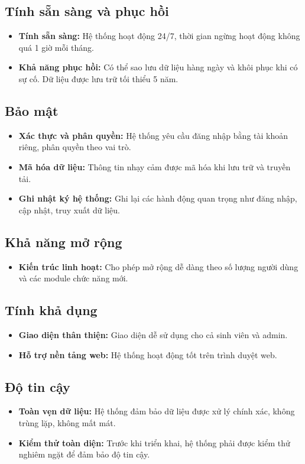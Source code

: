 \documentclass[12pt,a4paper]{report}
\begin{document}
\subsection{Tính sẵn sàng và phục hồi}
\begin{itemize}
    \item \textbf{Tính sẵn sàng:} Hệ thống hoạt động 24/7, thời gian ngừng hoạt động không quá 1 giờ mỗi tháng.
    \item \textbf{Khả năng phục hồi:} Có thể sao lưu dữ liệu hàng ngày và khôi phục khi có sự cố. Dữ liệu được lưu trữ tối thiểu 5 năm.
\end{itemize}

\subsection{Bảo mật}
\begin{itemize}
    \item \textbf{Xác thực và phân quyền:} Hệ thống yêu cầu đăng nhập bằng tài khoản riêng, phân quyền theo vai trò.
    \item \textbf{Mã hóa dữ liệu:} Thông tin nhạy cảm được mã hóa khi lưu trữ và truyền tải.
    \item \textbf{Ghi nhật ký hệ thống:} Ghi lại các hành động quan trọng như đăng nhập, cập nhật, truy xuất dữ liệu.
\end{itemize}

\subsection{Khả năng mở rộng}
\begin{itemize}
    \item \textbf{Kiến trúc linh hoạt:} Cho phép mở rộng dễ dàng theo số lượng người dùng và các module chức năng mới.
\end{itemize}

\subsection{Tính khả dụng}
\begin{itemize}
    \item \textbf{Giao diện thân thiện:} Giao diện dễ sử dụng cho cả sinh viên và admin.
    \item \textbf{Hỗ trợ nền tảng web:} Hệ thống hoạt động tốt trên trình duyệt web.
\end{itemize}

\subsection{Độ tin cậy}
\begin{itemize}
    \item \textbf{Toàn vẹn dữ liệu:} Hệ thống đảm bảo dữ liệu được xử lý chính xác, không trùng lặp, không mất mát.
    \item \textbf{Kiểm thử toàn diện:} Trước khi triển khai, hệ thống phải được kiểm thử nghiêm ngặt để đảm bảo độ tin cậy.
\end{itemize}
\end{document}
